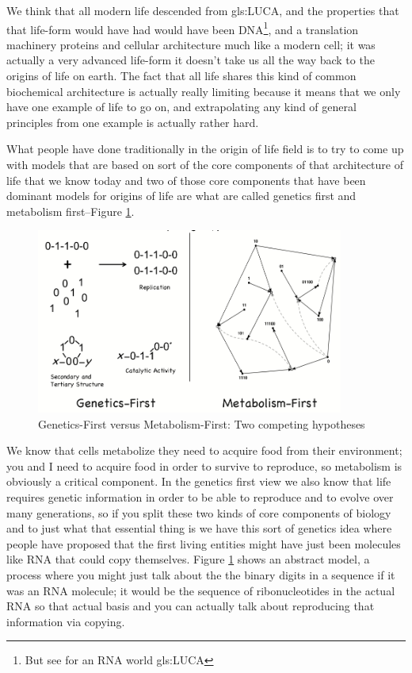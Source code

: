 \documentclass[]{article}
\begin{document}
We think that all
modern life descended from \gls{gls:LUCA}, and the
properties that that life-form would
have had would have been DNA\footnote{But see \cite{glansdorff2008last} for an RNA world \gls{gls:LUCA}}, and
a translation machinery proteins and
cellular architecture much like a modern
cell; it was actually a very advanced
life-form it doesn't take us all the way
back to the origins of life on earth.
The fact that all life shares this kind of
common biochemical architecture is
actually really limiting because it
means that we only have one example of
life to go on, and extrapolating any kind
of general principles from one example
is actually rather hard.

What people have done traditionally in the origin of
life field is to try to come up with
models that are based on sort of the core
components of that architecture of life
that we know today and two of those core
components that have been dominant
models for origins of life are what are
called genetics first  and metabolism first--Figure \ref{fig:GeneticsVsMetabolism}.

\begin{figure}[H]
	\caption[Genetics-First versus Metabolism-First]{Genetics-First versus Metabolism-First: Two competing hypotheses}\label{fig:GeneticsVsMetabolism}
	\includegraphics[width=0.9\textwidth]{GeneticsVsMetabolism}
\end{figure}

We know that cells metabolize
they need to acquire food from their
environment; you and I need to acquire
food in order to survive to
reproduce, so metabolism is obviously a
critical component. 
In the genetics first view we also know that
life requires genetic information in
order to be able to reproduce and to
evolve over many generations, so if
you split these two kinds of core
components of biology and to just what
that essential thing is we have this
sort of genetics idea where people have
proposed that the first living entities
might have just been molecules like RNA
that could copy themselves.
 Figure \ref{fig:GeneticsVsMetabolism} shows an
abstract model, a process
where you might just talk about the the
binary digits in a sequence if it was an
RNA molecule; it would be the sequence of
ribonucleotides in the actual RNA so
that actual basis and you can actually
talk about reproducing that information
via copying.
\end{document}
